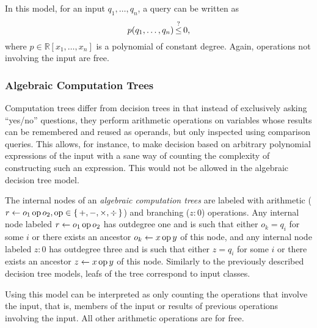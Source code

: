 In this model, for an input \(q_1,\ldots,q_n\), a query can be written as
\begin{displaymath}
	p(q_1, \ldots, q_n) \mathop{\le}^{?} 0,
\end{displaymath}
where \(p \in \mathbb{R}[x_1,\ldots, x_n]\) is a polynomial of constant
degree. Again, operations not involving the input are free.

\subsubsection{Algebraic Computation Trees}
Computation trees differ from decision trees in that instead of exclusively
asking
``yes/no'' questions, they perform arithmetic operations on variables whose
results can be remembered and reused as operands, but only inspected using
comparison queries. This allows, for instance, to make decision based on
arbitrary polynomial expressions of the input with a sane way of counting the
complexity of constructing such an expression. This would not be allowed in
the algebraic decision tree model.

The internal nodes of an \emph{algebraic computation trees} are labeled with
arithmetic (\(r \gets o_1 \operatorname{op} o_2, \operatorname{op} \in \{\,+,-,\times,\div\,\}\)) and
branching (\(z : 0\)) operations. Any internal node labeled \(r \gets o_1 \operatorname{op}
o_2\) has outdegree one and is
such that either \(o_k = q_i\) for some \(i\) or there exists an ancestor \(o_k
\gets x \operatorname{op} y\) of this node, and any internal node labeled \(z : 0\) has
outdegree three and is such that either \(z = q_i\) for some \(i\) or there
exists an ancestor \(z \gets x \operatorname{op} y\) of this node.
Similarly to the previously described decision tree models, leafs of the tree
correspond to input classes.

Using this model can be interpreted as only counting the operations that
involve the input, that is, members of the input or results of previous
operations involving the input. All other arithmetic operations are for free.

